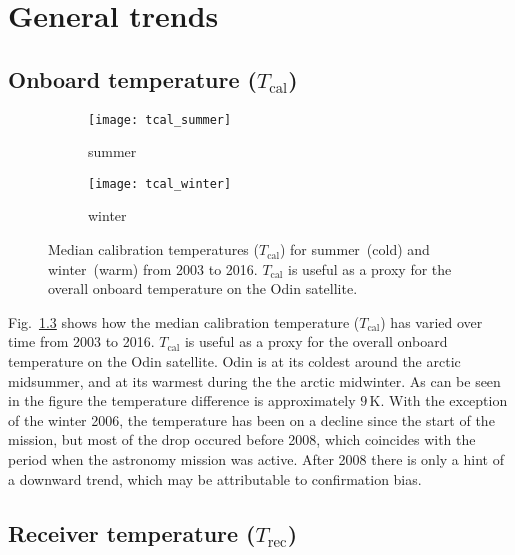 \chapter{General trends}
\label{ch:general}

\section{Onboard temperature ($T_\mathrm{cal}$)}
\label{sec:Tcal}

\begin{figure}[ht]
    \centering
    \begin{subfigure}[b]{0.9545\textwidth}
        \texttt{[image: tcal\_summer]}
        \caption{summer}\label{fig:tcal:summer}
    \end{subfigure}
    \begin{subfigure}[b]{0.9545\textwidth}
        \texttt{[image: tcal\_winter]}
        \caption{winter}\label{fig:tcal:winter}
    \end{subfigure}
    \caption{Median calibration temperatures ($T_\mathrm{cal}$) for
        summer~(cold) and winter~(warm) from 2003 to 2016. $T_\mathrm{cal}$ is
        useful as a proxy for the overall onboard temperature on the Odin
        satellite.}\label{fig:tcal}
\end{figure}

\noindent
Fig.~\ref{fig:tcal} shows how the median calibration temperature
($T_\mathrm{cal}$) has varied over time from 2003 to 2016.  $T_\mathrm{cal}$ is
useful as a proxy for the overall onboard temperature on the Odin satellite.
Odin is at its coldest around the arctic midsummer, and at its warmest during
the the arctic midwinter.  As can be seen in the figure the temperature
difference is approximately $9\,\mathrm{K}$.  With the exception of the
winter 2006, the temperature has been on a decline since the start of the
mission, but most of the drop occured before 2008, which coincides with the
period when the astronomy mission was active.  After 2008 there is only a hint
of a downward trend, which may be attributable to confirmation bias.


\section{Receiver temperature ($T_\mathrm{rec}$)}
\label{sec:Trec}

